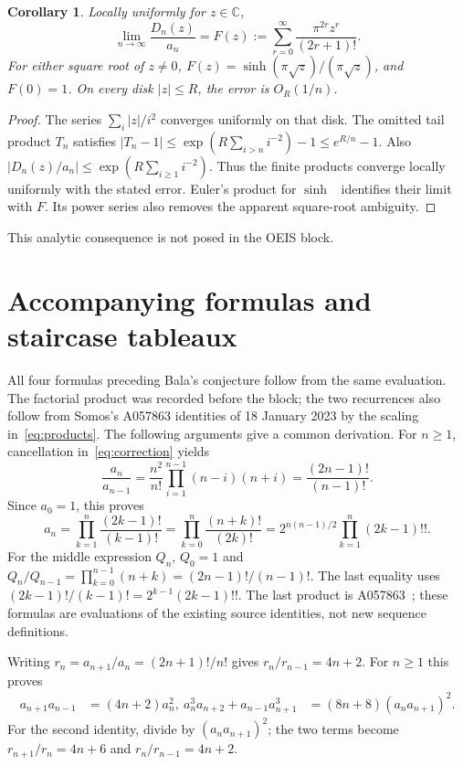 \documentclass[11pt]{article}
\newtheorem{corollary}[theorem]{Corollary}
\newcommand{\C}{\mathbb C}
\begin{document}
\begin{corollary}\label{cor:limit}
Locally uniformly for $z\in\C$,
\[
 \lim_{n\to\infty}\frac{D_n(z)}{a_n}
 =F(z):=\sum_{r=0}^{\infty}\frac{\pi^{2r}z^r}{(2r+1)!}.
\]
For either square root of $z\ne0$, $F(z)=\sinh(\pi\sqrt z)/(\pi\sqrt z)$,
and $F(0)=1$. On every disk $|z|\le R$, the error is $O_R(1/n)$.
\end{corollary}
\begin{proof}
The series $\sum_i |z|/i^2$ converges uniformly on that disk. The omitted
tail product $T_n$ satisfies
$|T_n-1|\le\exp(R\sum_{i>n}i^{-2})-1\le e^{R/n}-1$.
Also $|D_n(z)/a_n|\le\exp(R\sum_{i\ge1}i^{-2})$.
Thus the finite products converge locally uniformly with the stated error.
Euler's product for $\sinh$~\cite[4.36.1]{dlmf} identifies their limit with
$F$. Its power series also removes the apparent square-root ambiguity.
\end{proof}
This analytic consequence is not posed in the OEIS block.

\section{Accompanying formulas and staircase tableaux}
All four formulas preceding Bala's conjecture follow from the same evaluation.
The factorial product was recorded before the block; the two recurrences also
follow from Somos's A057863 identities of 18 January 2023 by the scaling
in~\eqref{eq:products}. The following arguments give a common derivation.
For $n\ge1$, cancellation in~\eqref{eq:correction} yields
\[
 \frac{a_n}{a_{n-1}}
 =\frac{n^2}{n!}\prod_{i=1}^{n-1}(n-i)(n+i)
 =\frac{(2n-1)!}{(n-1)!}.
\]
Since $a_0=1$, this proves
\begin{equation}\label{eq:products}
 a_n=\prod_{k=1}^n\frac{(2k-1)!}{(k-1)!}
 =\prod_{k=0}^{n}\frac{(n+k)!}{(2k)!}
 =2^{n(n-1)/2}\prod_{k=1}^n(2k-1)!!.
\end{equation}
For the middle expression $Q_n$, $Q_0=1$ and
$Q_n/Q_{n-1}=\prod_{k=0}^{n-1}(n+k)=(2n-1)!/(n-1)!$.
The last equality uses
$(2k-1)!/(k-1)!=2^{k-1}(2k-1)!!$.
The last product is A057863~\cite{odd}; these formulas are evaluations of
the existing source identities, not new sequence definitions.

Writing $r_n=a_{n+1}/a_n=(2n+1)!/n!$ gives
$r_n/r_{n-1}=4n+2$. For $n\ge1$ this proves
\begin{align}
 a_{n+1}a_{n-1}&=(4n+2)a_n^2,\
 a_n^3a_{n+2}+a_{n-1}a_{n+1}^3
   &=(8n+8)(a_na_{n+1})^2.\label{eq:quartic}
\end{align}
For the second identity, divide by $(a_na_{n+1})^2$; the two terms become
$r_{n+1}/r_n=4n+6$ and $r_n/r_{n-1}=4n+2$.
\end{document}
